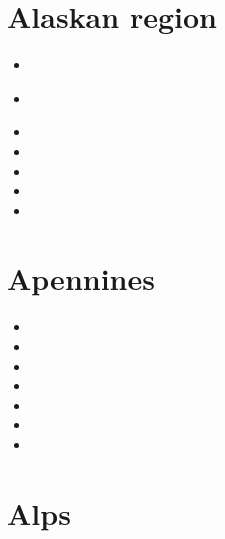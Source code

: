 \section{Alaskan region} 

\begin{small}
\begin{itemize}
\item[1996]
\item[\twothousandten] 
  \\
\item[\twothousandtwelve] 
\item[\twothousandthirteen] 
\item[\twothousandfifteen] 
\item[\twothousandseventeen] 
\item[\twothousandeighteen] 
\end{itemize}
\end{small}

\section{Apennines}

\begin{small}
\begin{itemize}
\item[\nineteenninetyeight] 
\item[\twothousandseven] 
\item[\twothousandnine] 
\item[\twothousandfourteen] 
\item[\twothousandfifteen] 
\item[\twothousandtwenty] 
\item[\twothousandtwentysix] 
\end{itemize}
\end{small}

\section{Alps}

